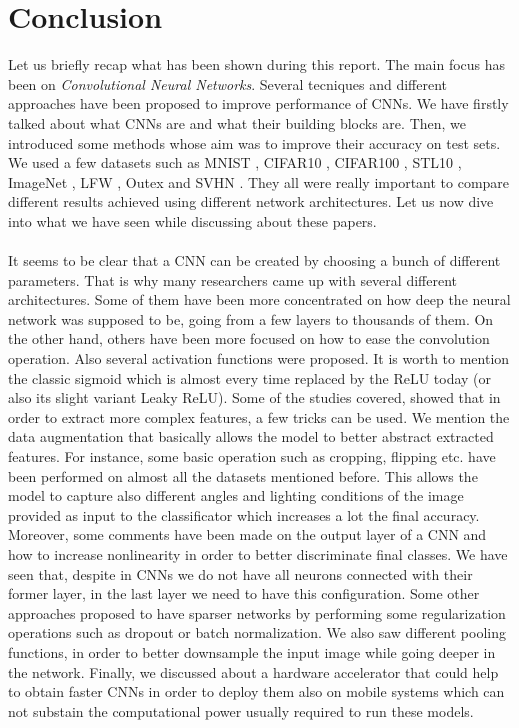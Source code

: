 \chapter{Conclusion}

Let us briefly recap what has been shown during this report. The main focus has been on \textit{Convolutional Neural Networks}. Several tecniques and different approaches have been proposed to improve performance of CNNs. We have firstly talked about what CNNs are and what their building blocks are. Then, we introduced some methods whose aim was to improve their accuracy on test sets. We used a few datasets such as MNIST \citep{MNIST}, CIFAR10 \citep{CIFAR10and100}, CIFAR100 \citep{CIFAR10and100}, STL10 \citep{STL10}, ImageNet \citep{ImageNet12}, LFW \citep{LFW}, Outex \citep{Outex} and SVHN \citep{SVHN}. They all were really important to compare different results achieved using different network architectures. Let us now dive into what we have seen while discussing about these papers.\\ \\
It seems to be clear that a CNN can be created by choosing a bunch of different parameters. That is why many researchers came up with several different architectures. Some of them have been more concentrated on how deep the neural network was supposed to be, going from a few layers to thousands of them. On the other hand, others have been more focused on how to ease the convolution operation. Also several activation functions were proposed. It is worth to mention the classic sigmoid which is almost every time replaced by the ReLU today (or also its slight variant Leaky ReLU). Some of the studies covered, showed that in order to extract more complex features, a few tricks can be used. We mention the data augmentation that basically allows the model to better abstract extracted features. For instance, some basic operation such as cropping, flipping etc. have been performed on almost all the datasets mentioned before. This allows the model to capture also different angles and lighting conditions of the image provided as input to the classificator which increases a lot the final accuracy. Moreover, some comments have been made on the output layer of a CNN and how to increase nonlinearity in order to better discriminate final classes. We have seen that, despite in CNNs we do not have all neurons connected with their former layer, in the last layer we need to have this configuration. Some other approaches proposed to have sparser networks by performing some regularization operations such as dropout or batch normalization. We also saw different pooling functions, in order to better downsample the input image while going deeper in the network. Finally, we discussed about a hardware accelerator that could help to obtain faster CNNs in order to deploy them also on mobile systems which can not substain the computational power usually required to run these models.\\ \\
